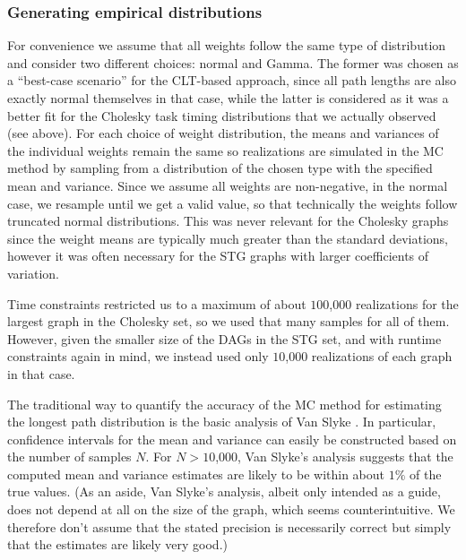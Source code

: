 \documentclass[12pt]{article}
\begin{document}
\subsubsection{Generating empirical distributions}
\label{subsubsect.generating}

For convenience we assume that all weights follow the same type of distribution and consider two different choices: normal and Gamma. The former was chosen as a ``best-case scenario'' for the CLT-based approach, since all path lengths are also exactly normal themselves in that case, while the latter is considered as it was a better fit for the Cholesky task timing distributions that we actually observed (see above). For each choice of weight distribution, the means and variances of the individual weights remain the same so realizations are simulated in the MC method by sampling from a distribution of the chosen type with the specified mean and variance. Since we assume all weights are non-negative, in the normal case, we resample until we get a valid value, so that technically the weights follow truncated normal distributions. This was never relevant for the Cholesky graphs since the weight means are typically much greater than the standard deviations, however it was often necessary for the STG graphs with larger coefficients of variation.     

Time constraints restricted us to a maximum of about $100$,$000$ realizations for the largest graph in the Cholesky set, so we used that many samples for all of them. However, given the smaller size of the DAGs in the STG set, and with runtime constraints again in mind, we instead used only $10$,$000$ realizations of each graph in that case.

The traditional way to quantify the accuracy of the MC method for estimating the longest path distribution is the basic analysis of Van Slyke \cite{van63}. In particular, confidence intervals for the mean and variance can easily be constructed based on the number of samples $N$. For $N > 10$,$000$, Van Slyke's analysis suggests that the computed mean and variance estimates are likely to be within about $1\%$ of the true values. (As an aside, Van Slyke's analysis, albeit only intended as a guide, does not depend at all on the size of the graph, which seems counterintuitive. We therefore don't assume that the stated precision is necessarily correct but simply that the estimates are likely very good.)

\end{document}

